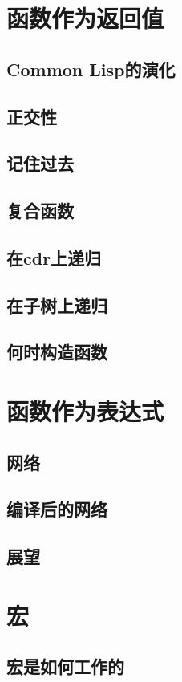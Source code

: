 \documentclass{ctexart}
\begin{document}
\section{函数作为返回值}
\label{sec-5}
\subsection{Common Lisp的演化}
\label{sec-5-1}
\subsection{正交性}
\label{sec-5-2}
\subsection{记住过去}
\label{sec-5-3}
\subsection{复合函数}
\label{sec-5-4}
\subsection{在cdr上递归}
\label{sec-5-5}
\subsection{在子树上递归}
\label{sec-5-6}
\subsection{何时构造函数}
\label{sec-5-7}
\section{函数作为表达式}
\label{sec-6}
\subsection{网络}
\label{sec-6-1}
\subsection{编译后的网络}
\label{sec-6-2}
\subsection{展望}
\label{sec-6-3}
\section{宏}
\label{sec-7}
\subsection{宏是如何工作的}
\label{sec-7-1}
\end{document}
